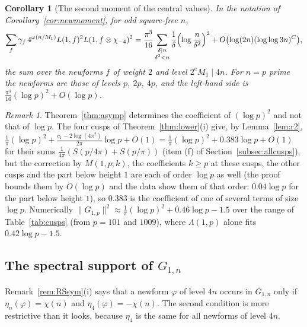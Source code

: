 ﻿\documentclass[11pt]{amsart}
\newtheorem{corollary}[theorem]{Corollary}
\theoremstyle{remark}
\newtheorem{remark}[theorem]{Remark}
\begin{document}
\begin{corollary}[The second moment of the central values]\label{cor:asympL}
In the notation of Corollary~\ref{cor:newmoment}, for odd square-free $n$,
\[
\sum_f\gamma_f\,4^{\omega(n/M_1)}L(1,f)^2L(1,f\otimes\chi_{-4})^2=\frac{\pi^3}{16}\sum_{\substack{\delta\mid n\\ \delta^2<n}}\frac1\delta\Bigl(\log\frac n{\delta^2}\Bigr)^2+O\bigl(\log(2n)(\log\log3n)^{C}\bigr),
\]
the sum over the newforms $f$ of weight $2$ and level $2^eM_1\mid4n$. For $n=p$ prime the newforms are those of levels $p$, $2p$, $4p$, and the left-hand side is $\frac{\pi^3}{16}(\log p)^2+O(\log p)$.
\end{corollary}

\begin{remark}\label{rem:second}
Theorem~\ref{thm:asymp} determines the coefficient of $(\log p)^2$ and not that of $\log p$. The four cusps of Theorem~\ref{thm:lower}(i) give, by Lemma~\ref{lem:r2}, $\frac1\pi(\log p)^2+\frac{c_1-2\log(4\pi^2)}{2\pi}\log p+O(1)=\frac1\pi(\log p)^2+0.383\log p+O(1)$ for their sums $\frac1{4\pi}(S(p/4\pi)+S(p/\pi))$ (item (f) of Section~\ref{subsec:allcusps}), but the correction by $M(1,p;k)$, the coefficients $k\ge p$ at these cusps, the other cusps and the part below height $1$ are each of order $\log p$ as well (the proof bounds them by $O(\log p)$ and the data show them of that order: $0.04\log p$ for the part below height $1$), so $0.383$ is the coefficient of one of several terms of size $\log p$. Numerically $\|G_{1,p}\|^2\approx\frac1\pi(\log p)^2+0.46\log p-1.5$ over the range of Table~\ref{tab:cusps} (from $p=101$ and $1009$), where $\Lambda(1,p)$ alone fits $0.42\log p-1.5$.
\end{remark}

\subsection{The spectral support of $G_{1,n}$}\label{subsec:support}
Remark~\ref{rem:RSsym}(i) says that a newform $\varphi$ of level $4n$ occurs in $G_{1,n}$ only if $\eta_n(\varphi)=\chi(n)$ and $\eta_4(\varphi)=-\chi(n)$. The second condition is more restrictive than it looks, because $\eta_4$ is the same for all newforms of level $4n$.
\end{document}
